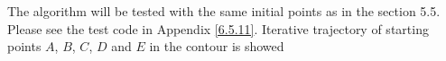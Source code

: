 The algorithm will be tested with the same initial
points as in the section 5.5. Please see the test code in Appendix \ref{6.5.11}. Iterative trajectory of starting points $A$, $B$, $C$, $D$ and $E$ in the contour is showed 
\begin{figure}[H]
\centering
{}
\quad
{}
\quad
\subfigure[$C(3,3)$]{
}
\end{figure}
